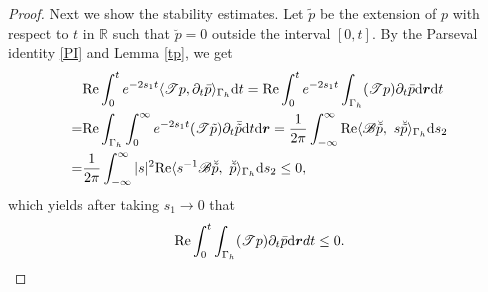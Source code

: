 \documentclass[final,leqno]{siamltex}
\begin{document}
\begin{proof}
Next we show the stability estimates. Let $\tilde p$ be the extension of $p$
with respect to $t$ in $\mathbb R$ such that $\breve p=0$ outside the interval
$[0, t].$  By the Parseval identity \eqref{PI} and Lemma \ref{tp}, we get
\begin{align*}
& {\rm Re} \int_{0}^{t} e^{-2 s_1 t} \langle \mathscr T  p,  {\partial_t \bar p}
\rangle_{\Gamma_h}{\rm d}t = {\rm Re} \int_0^t e^{-2 s_1 t} \int_{\Gamma_h}
(\mathscr T p)  {\partial_t \bar p} {\rm d} \boldsymbol r {\rm d}t\\
=& {\rm Re} \int_{\Gamma_h} \int_0^{\infty} e^{-2 s_1 t} (\mathscr T \tilde p)
{\partial_t \bar { \tilde p}} {\rm d} t{\rm d}  \boldsymbol r =\frac{1}{2 \pi}
\int_{-\infty}^{\infty} {\rm Re} \langle \mathscr{B} \breve {\tilde p},
~s \breve {\tilde p} \rangle_{\Gamma_h} {\rm d} s_2\\
 =&\frac{1}{2\pi} \int_{-\infty}^{\infty} |s|^2 {\rm Re} \langle s^{-1}
\mathscr{B} \breve {\tilde p}, ~\breve {\tilde p} \rangle_{\Gamma_h} {\rm d}
s_2 \leq 0,
\end{align*}
which yields after taking $s_1 \rightarrow 0$ that
\begin{align}\label{tp1}
 {\rm Re} \int_0^t  \int_{\Gamma_h} (\mathscr T p){\partial_t \bar p}{\rm
d}\boldsymbol r {d}t \leq 0.
\end{align}


\end{proof}
\end{document}
